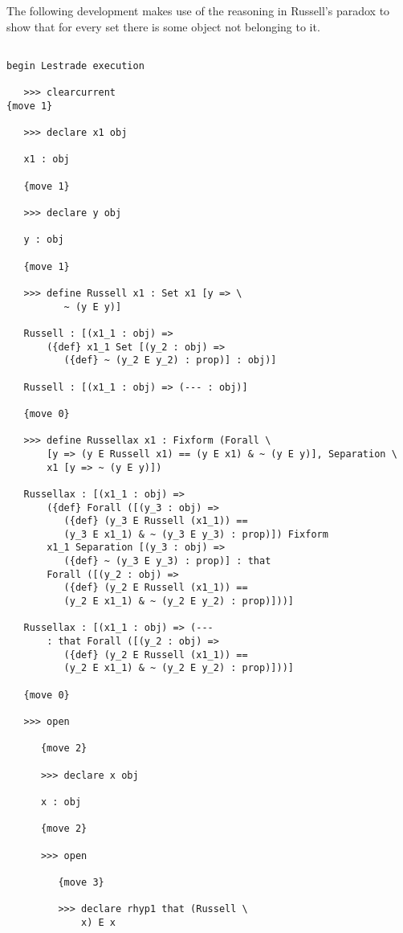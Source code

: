 \documentclass[12pt]{article}
\begin{document}

The following development makes use of the reasoning in Russell's paradox to show that for every set there is some object not belonging to it.

\begin{verbatim}

begin Lestrade execution

   >>> clearcurrent
{move 1}

   >>> declare x1 obj

   x1 : obj

   {move 1}

   >>> declare y obj

   y : obj

   {move 1}

   >>> define Russell x1 : Set x1 [y => \
          ~ (y E y)]

   Russell : [(x1_1 : obj) => 
       ({def} x1_1 Set [(y_2 : obj) => 
          ({def} ~ (y_2 E y_2) : prop)] : obj)]

   Russell : [(x1_1 : obj) => (--- : obj)]

   {move 0}

   >>> define Russellax x1 : Fixform (Forall \
       [y => (y E Russell x1) == (y E x1) & ~ (y E y)], Separation \
       x1 [y => ~ (y E y)])

   Russellax : [(x1_1 : obj) => 
       ({def} Forall ([(y_3 : obj) => 
          ({def} (y_3 E Russell (x1_1)) == 
          (y_3 E x1_1) & ~ (y_3 E y_3) : prop)]) Fixform 
       x1_1 Separation [(y_3 : obj) => 
          ({def} ~ (y_3 E y_3) : prop)] : that 
       Forall ([(y_2 : obj) => 
          ({def} (y_2 E Russell (x1_1)) == 
          (y_2 E x1_1) & ~ (y_2 E y_2) : prop)]))]

   Russellax : [(x1_1 : obj) => (--- 
       : that Forall ([(y_2 : obj) => 
          ({def} (y_2 E Russell (x1_1)) == 
          (y_2 E x1_1) & ~ (y_2 E y_2) : prop)]))]

   {move 0}

   >>> open

      {move 2}

      >>> declare x obj

      x : obj

      {move 2}

      >>> open

         {move 3}

         >>> declare rhyp1 that (Russell \
             x) E x


\end{verbatim}
\end{document}
